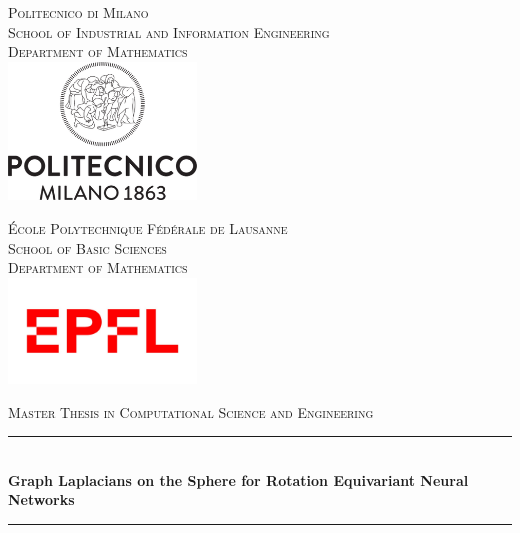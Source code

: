 
\begin{titlepage}
\newcommand{\HRule}{\rule{\linewidth}{1mm}} %
\begin{minipage}[t]{.49\textwidth}
	\raggedleft
	\center
	\textsc{\footnotesize Politecnico di Milano}\\
	\textsc{ \scriptsize School of Industrial and Information Engineering}\\
	\textsc{\scriptsize Department of Mathematics}\\[0.5cm]
	\includegraphics[width=5cm]{figs/cover/polimi.png}
\end{minipage}
\hfill
%
\begin{minipage}[t]{.49\textwidth}
	\raggedright
	\center
	\textsc{\footnotesize \'Ecole Polytechnique F\'ed\'erale de Lausanne}\\
	\textsc{\scriptsize School of Basic Sciences}\\
	\textsc{\scriptsize Department of Mathematics}\\[0.8cm]
	\includegraphics[width=5cm]{figs/cover/EPFL.jpg}
\end{minipage}
\center %
\vspace{1cm}

\textsc{\large Master Thesis in Computational Science and Engineering}\\[1cm]

\HRule \\[0.4cm]
{ \LARGE \bfseries Graph Laplacians on the Sphere for Rotation Equivariant Neural Networks}\\[0.4cm] 
\HRule \\[1.5cm]     
\vfill 


\end{titlepage}
